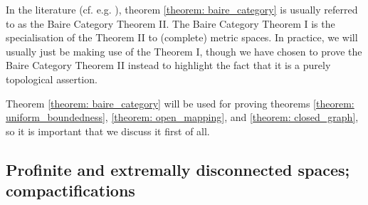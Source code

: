         \begin{remark} \label{remark: baire_category_theorems_1_and_2}
            In the literature (cf. e.g. \cite[Theorem 2.2.2]{litvak_functional_analysis_notes}), theorem \ref{theorem: baire_category} is usually referred to as the Baire Category Theorem II. The Baire Category Theorem I is the specialisation of the Theorem II to (complete) metric spaces. In practice, we will usually just be making use of the Theorem I, though we have chosen to prove the Baire Category Theorem II instead to highlight the fact that it is a purely topological assertion.
        \end{remark}
        \begin{remark}
            Theorem \ref{theorem: baire_category} will be used for proving theorems \ref{theorem: uniform_boundedness}, \ref{theorem: open_mapping}, and \ref{theorem: closed_graph}, so it is important that we discuss it first of all.
        \end{remark}

    \subsection{Profinite and extremally disconnected spaces; compactifications}